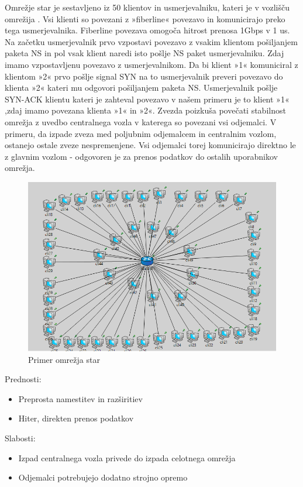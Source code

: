 \documentclass[11pt,a4paper,slovene]{myarticle}
\begin{document}
Omrežje star je sestavljeno iz 50 klientov in usmerjevalniku, kateri je v vozlišču omrežija . Vsi klienti so povezani z »fiberline« povezavo in komunicirajo preko tega usmerjevalnika. Fiberline povezava omogoča hitrost prenosa 1Gbps  v 1 us. Na začetku usmerjevalnik prvo vzpostavi povezavo z vsakim klientom pošiljanjem paketa NS in pol vsak klient naredi isto pošlje NS paket usmerjevalniku. Zdaj imamo vzpostavljenu povezavo z usmerjevalnikom. Da bi klient »1« komuniciral  z klientom »2«  prvo pošlje signal SYN  na to usmerjevalnik preveri povezavo do klienta »2« kateri mu odgovori pošiljanjem paketa NS. Usmerjevalnik pošlje SYN-ACK klientu kateri je zahteval povezavo v našem primeru je to klient »1« ,zdaj imamo povezana klienta »1« in »2«. Zvezda poizkuša povečati stabilnost omrežja z uvedbo centralnega vozla v katerega so povezani vsi odjemalci. V primeru, da izpade zveza med poljubnim odjemalcem in centralnim vozlom, ostanejo ostale zveze nespremenjene. Vsi odjemalci torej komunicirajo direktno le z glavnim vozlom - odgovoren je za prenos podatkov do ostalih uporabnikov omrežja. 
\begin{figure}[H]
\includegraphics[scale=0.5]{slike/starNetwork.png}
\caption{Primer omrežja star}
\end{figure}

Prednosti:
\begin{itemize}
\item Preprosta namestitev in razširitiev
\item Hiter, direkten prenos podatkov
\end{itemize}
Slabosti:
\begin{itemize}
\item Izpad centralnega vozla privede do izpada celotnega omrežja
\item Odjemalci potrebujejo dodatno strojno opremo
\end{itemize}
\end{document}
